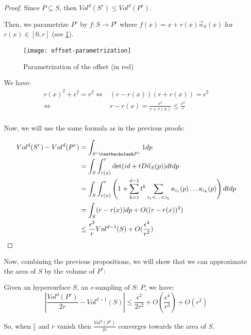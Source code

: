 \begin{proof}
    Since $ P \subseteq S $, then $ Vol^d(S^r) \leq Vol^d(P^r) $.

    Then, we parametrize $ P^r $ by $ f : S \rightarrow P^r $ where $ f(x) = x +
    r(x) \vec{n}_S(x) $ for $ r(x) \in [0, r] $ (see
    \ref{fig:offset-parametrization}).

    \begin{figure}[h]
        \centering
        \texttt{[image: offset-parametrization]}
        \caption{Parametrization of the offset (in red)}
        \label{fig:offset-parametrization}
    \end{figure}

    We have:
    \begin{align*}
        r(x)^2 + \epsilon^2 = r^2 \iff& (r - r(x)) (r + r(x)) = \epsilon^2 \\
        \iff& r - r(x) = \frac{\epsilon^2}{r + r(x)} \leq \frac{\epsilon^2}{r} \\
    \end{align*}

    Now, we will use the same formula as in the previous proofs:

    \begin{align*}
        Vol^d(S^r) - Vol^d(P^r) &= \int_{S^r \textbackslash P^r} 1 dp \\
        &= \int_S \int_{r(x)}^r \det(id + t D \vec{n}_S(p)) dt dp \\
        &= \int_S \int_{r(x)}^r \left( 1 + \sum_{k=1}^{d-1} t^k \sum_{i_1 < \ldots
                < i_k} \kappa_{i_1}(p) \ldots \kappa_{i_k}(p) \right) dt dp \\
        &= \int_S (r - r(x)) dp + O((r - r(x))^2) \\
        &\leq \frac{\epsilon^2}{r} Vol^{d-1}(S) + O(\frac{\epsilon^4}{r^2})
    \end{align*}
\end{proof}

Now, combining the previous propositions, we will show that we can approximate
the area of $ S $ by the volume of $ P^r $:

\begin{proposition}
    \label{prop:approx-volume-area}
    Given an hypersurface $ S $, an $\epsilon$-sampling of $ S $: $ P $, we
    have:
    $$ | \frac{Vol^d(P^r)}{2r} - Vol^{d-1}(S) | \leq \frac{\epsilon^2}{2r^2} +
    O(\frac{\epsilon^4}{r^3}) + O(r^2) $$

    So, when $ \frac{\epsilon}{r} $ and $ r $ vanish then $
    \frac{Vol^d(P^r)}{2r} $ converges towards the area of $ S $.
\end{proposition}

